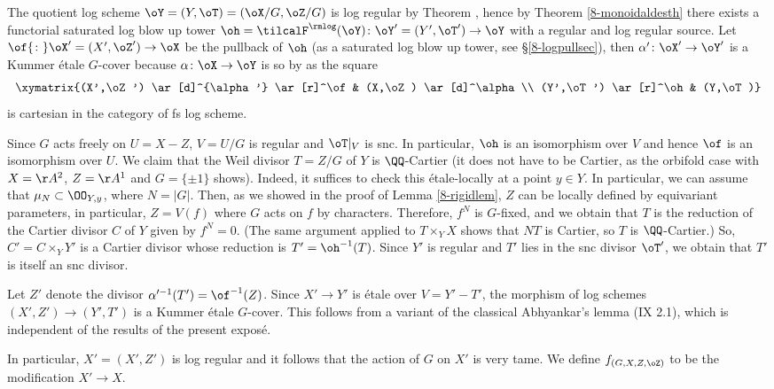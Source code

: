 \documentclass[10pt]{../fichiers-configuration-latex/smfart}
\begin{document}
The quotient log scheme $\oY=(Y,\oT)=(\oX/G,\oZ/G)$ is log regular
by Theorem , hence by Theorem \ref{8-monoidaldesth}
there exists a functorial saturated log blow up tower
$\oh=\tilcalF^\rmlog(\oY){\colon}\oY'=(Y',\oT')\to\oY$ with a regular
and log regular source. Let $\of{\colon}\oX'=(X',\oZ')\to\oX$
be the pullback of $\oh$ (as a saturated log blow up tower, see
\S\ref{8-logpullsec}), then $\alpha'{\colon}\oX'\to\oY'$ is a Kummer
\'etale $G$-cover because $\alpha{\colon}\oX\to\oY$ is so by 
as the square $$ \xymatrix{(X',\oZ') \ar[d]^{\alpha'} \ar[r]^\of&
(X,\oZ) \ar[d]^\alpha \\ (Y',\oT') \ar[r]^\oh & (Y,\oT)} $$ is
cartesian in the category of fs log scheme.

Since $G$ acts freely on $U=X-Z$, $V=U/G$ is regular and $\oT|_V$
is snc. In particular, $\oh$ is an isomorphism over $V$ and hence
$\of$ is an isomorphism over $U$.  We claim that the Weil divisor
$T=Z/G$ of $Y$ is $\QQ$-Cartier (it does not have to be Cartier,
as the orbifold case with $X=\AA^2$, $Z=\AA^1$ and $G=\{\pm 1\}$
shows). Indeed, it suffices to check this \'etale-locally at a
point $y\in Y$. In particular, we can assume that $\mu_N\subset
\OO_{Y,y}$, where $N=|G|$. Then, as we showed in the proof of Lemma
\ref{8-rigidlem}, $Z$ can be locally defined by equivariant
parameters, in particular, $Z=V(f)$ where $G$ acts on $f$ by
characters. Therefore, $f^N$ is $G$-fixed, and we obtain that
$T$ is the reduction of the Cartier divisor $C$ of $Y$ given by
$f^N=0$. (The same argument applied to $T\times_YX$ shows that $NT$
is Cartier, so $T$ is $\QQ$-Cartier.) So, $C'=C\times_YY'$ is a
Cartier divisor whose reduction is $T'=\oh^{-1}(T)$. Since $Y'$
is regular and $T'$ lies in the snc divisor $\oT'$, we obtain that
$T'$ is itself an snc divisor.

Let $Z'$ denote the divisor $\alpha'^{-1}(T')=\of^{-1}(Z)$. Since
$X'\to Y'$ is \'etale over $V=Y'-T'$, the morphism of log schemes
$(X',Z')\to(Y',T')$ is a Kummer \'etale $G$-cover. This follows
from a variant of the classical Abhyankar's lemma (IX 2.1), which
is independent of the results of the present expos\'e.

In particular, $X'=(X',Z')$ is log regular and it follows that the
action of $G$ on $X'$ is very tame. We define $f_{(G,X,Z,\oZ)}$
to be the modification $X'\to X$.
\end{document}
